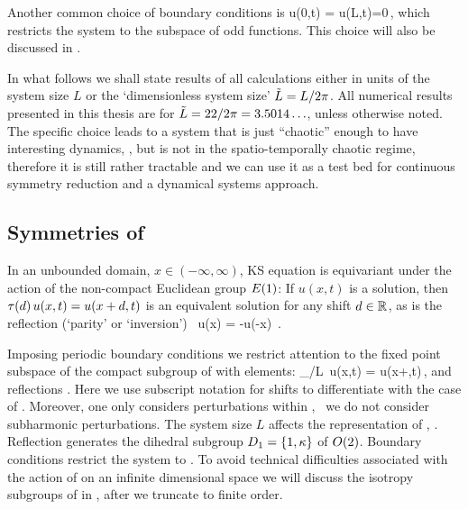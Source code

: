 Another common choice of boundary conditions is
\beq
  u(0,t) = u(L,t)=0\,,
 \label{eq:KSodd}
\eeq
which restricts the system to the subspace of odd functions. This choice will also be discussed
in .

In what follows
we shall state results of all calculations either in units of the system size $L$
or the `dimensionless system size' $\tilde{L}=L/2\pi$.
All numerical results presented in this thesis
are for $\tilde{L}=22/2\pi = 3.5014\ldots$, unless otherwise
noted. The specific choice leads to a system that is just ``chaotic'' enough
to have interesting dynamics, \cf {}, but is not in the spatio-temporally chaotic
regime, therefore it is still rather tractable and we can use it as a test bed for
continuous symmetry reduction and a dynamical systems approach.


\subsection{Symmetries of \KSe}
\label{sec:KSeSymm}

In an unbounded domain, $x\in(-\infty,\infty)$, KS equation is equivariant
under the action of the non-compact Euclidean group $E(1)$:
If $u(x,t)$ is a solution, then
$\tau({d})\, u(x,t) = u(x+d,t)$
is an equivalent solution for any shift
$d\in\mathbb{R}^{}$, as is the reflection (`parity' or `inversion')
\beq
    \Refl \, u(x) = -u(-x)
\,.

Imposing periodic boundary conditions we restrict attention to the fixed
point subspace of the compact subgroup  of  with elements:
\beq
	\Shift_{\shift/L}\, u(x,t) = u(x+\shift,t)\,,\qquad \shift\in\left[-L/2,L/2\right]	
	\label{KSshift}
\eeq
and reflections . Here we use subscript
notation for shifts to differentiate with the case of .
Moreover, one only considers perturbations within ,
\ie\ we do not consider subharmonic perturbations. The system
size $L$ affects the representation of , \cf
{}.  Reflection
generates the dihedral subgroup $D_{1} = \{1, \kappa\}$ of
$O(2)$. Boundary conditions  restrict the
system to . To avoid technical difficulties
associated with the action of  on an infinite dimensional
space we will discuss the isotropy subgroups of  in
, after we truncate  to finite
order.



